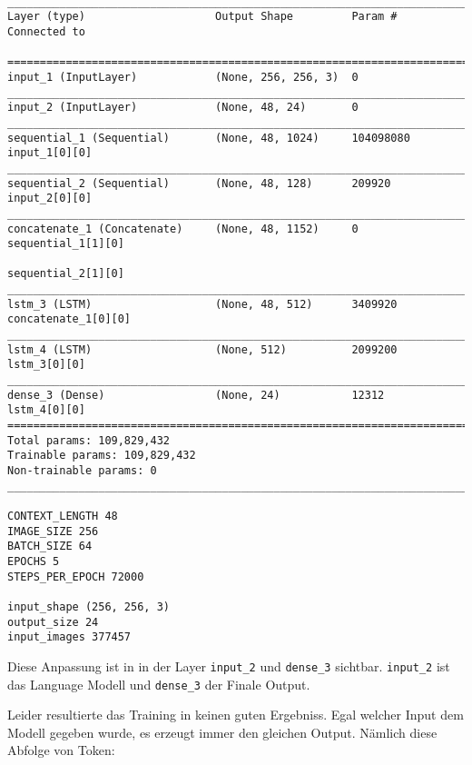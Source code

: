 \documentclass[pdftex,a4paper,halfparskip]{scrartcl}
\begin{document}
\begin{verbatim}

_____________________________________________________________________________________
Layer (type)                    Output Shape         Param #     Connected to

=====================================================================================
input_1 (InputLayer)            (None, 256, 256, 3)  0
_____________________________________________________________________________________
input_2 (InputLayer)            (None, 48, 24)       0
_____________________________________________________________________________________
sequential_1 (Sequential)       (None, 48, 1024)     104098080   input_1[0][0]
_____________________________________________________________________________________
sequential_2 (Sequential)       (None, 48, 128)      209920      input_2[0][0]
_____________________________________________________________________________________
concatenate_1 (Concatenate)     (None, 48, 1152)     0           sequential_1[1][0]
                                                                 sequential_2[1][0]
_____________________________________________________________________________________
lstm_3 (LSTM)                   (None, 48, 512)      3409920     concatenate_1[0][0]
_____________________________________________________________________________________
lstm_4 (LSTM)                   (None, 512)          2099200     lstm_3[0][0]
_____________________________________________________________________________________
dense_3 (Dense)                 (None, 24)           12312       lstm_4[0][0]
=====================================================================================
Total params: 109,829,432
Trainable params: 109,829,432
Non-trainable params: 0
_____________________________________________________________________________________

CONTEXT_LENGTH 48
IMAGE_SIZE 256
BATCH_SIZE 64
EPOCHS 5
STEPS_PER_EPOCH 72000

input_shape (256, 256, 3)
output_size 24
input_images 377457

\end{verbatim}

Diese Anpassung ist in in der Layer \texttt{input\_2} und \texttt{dense\_3} sichtbar. \texttt{input\_2} ist das Language Modell und \texttt{dense\_3} der Finale Output.

Leider resultierte das Training in keinen guten Ergebniss. Egal welcher Input dem Modell gegeben wurde, es erzeugt immer den gleichen Output. Nämlich diese Abfolge von Token:
\end{document}
